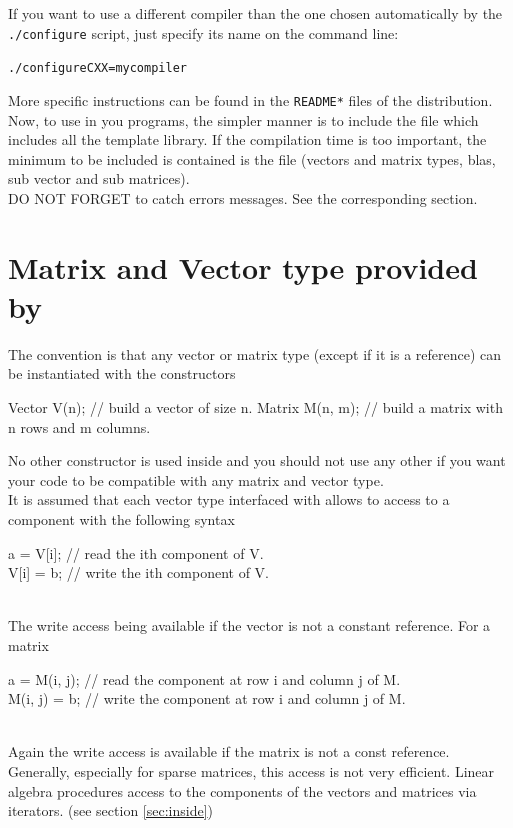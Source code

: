 \documentclass[11pt,a4paper]{article}
\begin{document}
If you want to use a different compiler than the one chosen
automatically by the \texttt{./configure} script, just specify its
name on the command line:
\begin{alltt}
  ./configure CXX=mycompiler
\end{alltt}
More specific instructions can be found in the \texttt{README*} files of
the distribution.\\[0.2cm]

Now, to use \gmm in you programs, the simpler manner is to include the file  which includes all the template library. If the compilation time is too important, the minimum to be included is contained is the file  (vectors and matrix types, blas, sub vector and sub matrices).\\[0.2cm]

DO NOT FORGET to catch errors messages. See the corresponding section.

\section{Matrix and Vector type provided by \gmm}

The convention is that any vector or matrix type (except if it is a  reference)
can be instantiated with the constructors
\begin{cppcode}
  Vector V(n);        // build a vector of size n.
  Matrix M(n, m);     // build a matrix with n rows and m columns.
\end{cppcode}
No other constructor is used inside \gmm and you should not use any other if you want your code
to be compatible with any matrix and vector type.\\[0.2cm]

It is assumed that each vector type interfaced with \gmm allows to
access to a component with the following syntax\\[0.2cm]
\begin{cppcode}
  a = V[i];    // read the ith component of V. \\
  V[i] = b;    // write the ith component of V.
\end{cppcode}$\;$\\[0.2cm]
The write access being available if the vector is not a constant reference. For a matrix\\[0.2cm]
\begin{cppcode}
  a = M(i, j); // read the component at row i and column j of M. \\
  M(i, j) = b; //  write the component at row i and column j of M.
\end{cppcode}$\;$\\[0.2cm]
Again the write access is available if the matrix is not a const reference. Generally, especially for sparse matrices, this access is not very efficient. Linear algebra procedures access to the components of the vectors and matrices via iterators. (see section  \ref{sec:inside}) \\[0.2cm]
\end{document}
